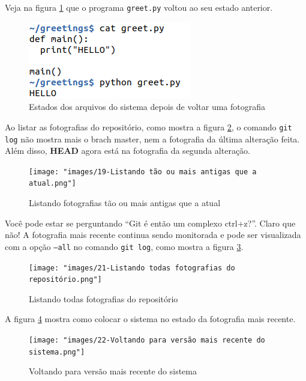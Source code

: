 \documentclass[a4paper]{book}
\begin{document}
Veja na figura \ref{fig:20} que o programa \texttt{greet.py}
voltou ao seu estado anterior.

\begin{figure}[ht]
\caption{Estados dos arquivos do sistema depois de voltar uma fotografia}
\label{fig:20}
\centering
\includegraphics[scale=0.6,left]{"images/20-Estados dos arquivos do sistema depois de voltar uma fotografia.png"}
\end{figure}

Ao listar as fotografias do repositório, como mostra a figura 
\ref{fig:19}, o comando \texttt{git log} não mostra mais o brach master, nem a fotografia da última alteração feita.
Além disso, \textbf{HEAD} agora está na fotografia da segunda 
alteração.

\begin{figure}[ht]
\caption{Listando fotografias tão ou mais antigas que a atual}
\label{fig:19}
\centering
\texttt{[image: "images/19-Listando tão ou mais antigas que a atual.png"]}
\end{figure}

Você pode estar se perguntando ``Git é então um complexo ctrl+z?''. Claro que não!
A fotografia mais recente continua sendo monitorada e 
pode ser visualizada com a opção \texttt{--all}
no comando \texttt{git log}, como mostra a 
figura \ref{fig:21}.

\begin{figure}[!h]
\caption{Listando todas fotografias do repositório}
\label{fig:21}
\centering
\texttt{[image: "images/21-Listando todas fotografias do repositório.png"]}
\end{figure}


A figura \ref{fig:22} mostra como colocar o sistema no
estado da fotografia mais recente.

\begin{figure}[ht]
\caption{Voltando para versão mais recente do sistema}
\label{fig:22}
\centering
\texttt{[image: "images/22-Voltando para versão mais recente do sistema.png"]}
\end{figure}
\end{document}
